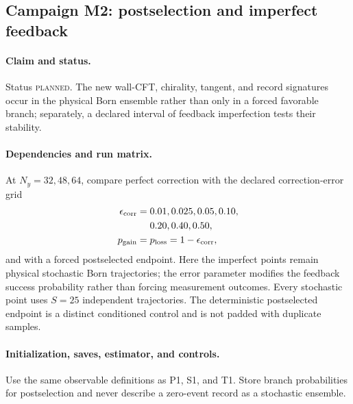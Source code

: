 \documentclass[aps,prx,twocolumn,floatfix,nofootinbib,superscriptaddress,longbibliography]{revtex4-2}
\newcommand{\planned}{\textsc{planned}}
\begin{document}
\fi
\subsection{Campaign M2: postselection and imperfect feedback}
\label{camp:M2}
\paragraph*{Claim and status.}
Status \planned.  The new wall-CFT, chirality, tangent, and record signatures occur in the
physical Born ensemble rather than only in a forced favorable branch; separately, a
declared interval of feedback imperfection tests their stability.

\paragraph*{Dependencies and run matrix.}
At $N_y=32,48,64$, compare perfect correction with the declared correction-error grid
\begin{equation}
 \begin{aligned}
 \epsilon_{\rm corr}&=0.01,0.025,0.05,0.10,\\
                     &\phantom{{}={}}0.20,0.40,0.50,\\
 p_{\rm gain}&=p_{\rm loss}=1-\epsilon_{\rm corr},
 \end{aligned}
 \label{eq:M2-production-error-grid}
\end{equation}
and with a forced postselected endpoint.  Here the imperfect points remain physical
stochastic Born trajectories; the error parameter modifies the feedback success
probability rather than forcing measurement outcomes.  Every stochastic point uses
$S=25$ independent trajectories.  The deterministic postselected endpoint is a distinct
conditioned control and is not padded with duplicate samples.

\paragraph*{Initialization, saves, estimator, and controls.}
Use the same observable definitions as P1, S1, and T1.  Store branch probabilities for
postselection and never describe a zero-event record as a stochastic ensemble.
\end{document}
